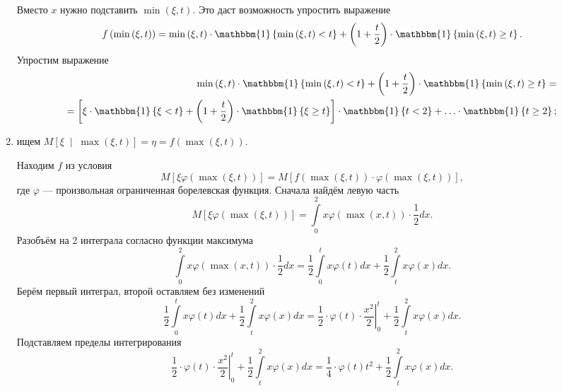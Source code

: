 \begin{enumerate}[label=\alph*)]
  Вместо $x$ нужно подставить $ \min \left( \xi, t \right) $.
  Это даст возможность упростить выражение
  $$f \left( \min \left( \xi, t \right) \right) =
    \min \left( \xi, t \right) \cdot \mathbbm{1} \left\{ \min \left( \xi, t \right) < t \right\} +
    \left( 1 + \frac{t}{2} \right) \cdot
    \mathbbm{1} \left\{ \min \left( \xi, t \right) \geq t \right\}.$$
  Упростим выражение
  \begin{equation*}
    \begin{split}
      \min \left( \xi, t \right) \cdot \mathbbm{1} \left\{ \min \left( \xi, t \right) < t \right\} +
      \left( 1 + \frac{t}{2} \right) \cdot
      \mathbbm{1} \left\{ \min \left( \xi, t \right) \geq t \right\} = \\
      = \left[ \xi \cdot \mathbbm{1} \left\{ \xi < t \right\} +
      \left( 1 + \frac{t}{2} \right) \cdot \mathbbm{1} \left\{ \xi \geq t \right\} \right] \cdot
      \mathbbm{1} \left\{ t < 2 \right\} +
      \dotsc \cdot \mathbbm{1} \left\{ t \geq 2 \right\};
    \end{split}
  \end{equation*}
  \item ищем
  $M \left[ \xi \; \middle| \; \max \left( \xi, t \right) \right] =
    \eta =
    f \left( \max \left( \xi, t \right) \right) $.

  Находим $f$ из условия
  $$M \left[ \xi \varphi \left( \max \left( \xi, t \right) \right) \right] =
    M \left[
      f \left( \max \left( \xi, t \right) \right) \cdot
      \varphi \left( \max \left( \xi, t \right) \right)
    \right],$$
  где $ \varphi $ --- произвольная ограниченная борелевская функция.
  Сначала найдём левую часть
  $$M \left[ \xi \varphi \left( \max \left( \xi, t \right) \right) \right] =
    \int \limits_0^2 x \varphi \left( \max \left( x, t \right) \right) \cdot \frac{1}{2} dx.$$
  Разобъём на 2 интеграла согласно функции максимума
  $$ \int \limits_0^2 x \varphi \left( \max \left( x, t \right) \right) \cdot \frac{1}{2} dx =
    \frac{1}{2} \int \limits_0^t x \varphi \left( t \right) dx +
    \frac{1}{2} \int \limits_t^2 x \varphi \left( x \right) dx.$$
  Берём первый интеграл, второй оставляем без изменений
  $$ \frac{1}{2} \int \limits_0^t x \varphi \left( t \right) dx +
    \frac{1}{2} \int \limits_t^2 x \varphi \left( x \right) dx =
    \frac{1}{2} \cdot \left. \varphi \left( t \right) \cdot \frac{x^2}{2} \right|_0^t +
    \frac{1}{2} \int \limits_t^2 x \varphi \left( x \right) dx.$$
  Подставляем пределы интегрирования
  $$ \frac{1}{2} \cdot \left. \varphi \left( t \right) \cdot \frac{x^2}{2} \right|_0^t +
    \frac{1}{2} \int \limits_t^2 x \varphi \left( x \right) dx =
    \frac{1}{4} \cdot \varphi \left( t \right) t^2 +
    \frac{1}{2} \int \limits_t^2 x \varphi \left( x \right) dx.$$


\end{enumerate}
